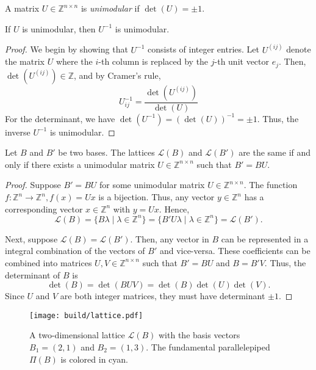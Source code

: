 \begin{definition}
  A matrix $U ∈ ℤ^{n×n}$ is \emph{unimodular} if $\det(U) = ±1$.
\end{definition}

\begin{lemma}
  If $U$ is unimodular, then $U^{-1}$ is unimodular.
\end{lemma}

\begin{proof}
  We begin by showing that $U^{-1}$ consists of integer entries.
  Let $U^{(ij)}$ denote the matrix $U$ where the $i$-th column is replaced by the $j$-th unit vector $e_j$.
  Then, $\det(U^{(ij)}) ∈ ℤ$, and by Cramer's rule,
  \[
    U_{ij}^{-1} = \frac{\det(U^{(ij)})}{\det(U)}
  \]
  For the determinant, we have $\det(U^{-1}) = (\det(U))^{-1} = ±1$.
  Thus, the inverse $U^{-1}$ is unimodular.
\end{proof}

\begin{lemma}
  \label{lem:unimodular}
  Let $B$ and $B'$ be two bases.
  The lattices $\mathcal L(B)$ and $\mathcal L(B')$ are the same if and only if
  there exists a unimodular matrix $U ∈ ℤ^{n×n}$ such that $B' = BU$.
\end{lemma}

\begin{proof}
  Suppose $B' = BU$ for some unimodular matrix $U ∈ ℤ^{n×n}$.
  The function $f \colon ℤ^n → ℤ^n, f(x) = Ux$ is a bijection.
  Thus, any vector $y ∈ ℤ^n$ has a corresponding vector $x ∈ ℤ^n$ with $y = Ux$.
  Hence,
  \[
    \mathcal L(B)  = \{ B λ \mid λ ∈ ℤ^n \} = \{ B' U λ \mid λ ∈ ℤ^n \} = \mathcal L(B').
  \]

  Next, suppose $\mathcal L(B) = \mathcal L(B')$.
  Then, any vector in $B$ can be represented in a integral combination of the
  vectors of $B'$ and vice-versa.
  These coefficients can be combined into matrices $U, V ∈ ℤ^{n×n}$ such that $B' = BU$ and $B = B'V$.
  Thus, the determinant of $B$ is
  \[
    \det(B) = \det(BUV) = \det(B) \det(U) \det(V).
  \]
  Since $U$ and $V$ are both integer matrices,
  they must have determinant $±1$.
\end{proof}

\begin{figure}[tbp]
  \centering
  \texttt{[image: build/lattice.pdf]}
  \caption{
    A two-dimensional lattice $\mathcal L(B)$ with the basis vectors $B_1 = (2, 1)$
    and $B_2 = (1, 3)$.
    The fundamental parallelepiped $Π(B)$ is colored in {\color{cyan}cyan}.
  }
\end{figure}

